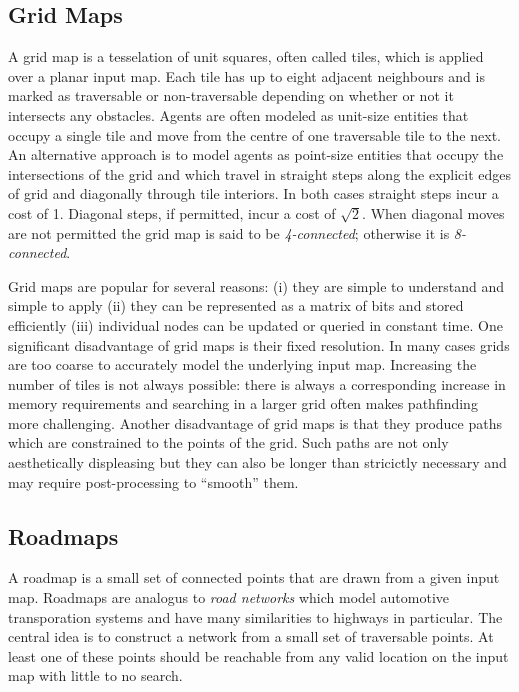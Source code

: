 \subsection{Grid Maps}
\label{cha::lit::graphs::grid}
A grid map is a tesselation of unit squares, often called tiles, which is
applied over a planar input map. Each tile has up to eight adjacent neighbours
and is marked as traversable or non-traversable depending on whether or not it
intersects any obstacles.  Agents are often modeled as unit-size entities that
occupy a single tile and move from the centre of one traversable tile to the
next.  
An alternative approach is to model agents as point-size entities that occupy 
the intersections of the grid and which travel in straight steps along the
explicit edges of grid and diagonally through tile interiors.
In both cases straight steps incur a cost of 1. Diagonal steps, if permitted, 
incur a cost of $\sqrt{2}$.  When diagonal moves are not permitted the grid map 
is said to be \emph{4-connected}; otherwise it is \emph{8-connected}.  

Grid maps are popular for several reasons: (i) they are simple to understand 
and simple to apply (ii) they can be represented as a matrix of bits and stored
efficiently (iii) individual nodes can be updated or queried in constant time.
One significant disadvantage of grid maps is their fixed resolution. In many cases 
grids are too coarse to accurately model the underlying input map. Increasing the
number of tiles is not always possible: there is always a corresponding increase in
memory requirements and searching in a larger grid often makes pathfinding more 
challenging.
Another disadvantage of grid maps is that they produce paths which are
constrained to the points of the grid. Such paths are not only aesthetically
displeasing but they can also be longer than stricictly necessary and may
require post-processing to ``smooth'' them.

\subsection{Roadmaps}
\label{cha::lit::graphs::road}
A roadmap is a small set of connected points that are drawn from a given
input map. Roadmaps are analogus to \emph{road networks} which model automotive 
transporation systems and have many similarities to highways in particular. 
The central idea is to construct a network from a small set of traversable
points. At least one of these points should be reachable from any valid location
on the input map with little to no search.


